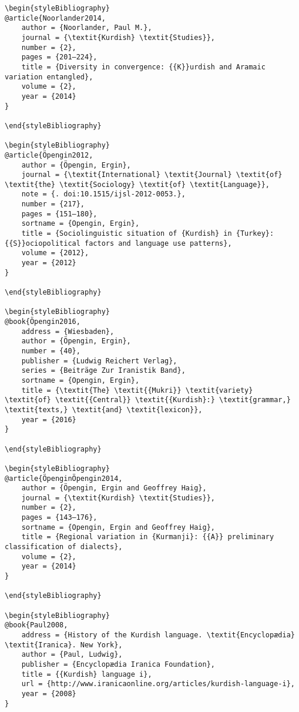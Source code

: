 \documentclass[output=paper]{langsci/langscibook}
\begin{document}
\begin{verbatim}
\begin{styleBibliography}
@article{Noorlander2014,
	author = {Noorlander, Paul M.},
	journal = {\textit{Kurdish} \textit{Studies}},
	number = {2},
	pages = {201–224},
	title = {Diversity in convergence: {{K}}urdish and Aramaic variation entangled},
	volume = {2},
	year = {2014}
}

\end{styleBibliography}

\begin{styleBibliography}
@article{Öpengin2012,
	author = {Öpengin, Ergin},
	journal = {\textit{International} \textit{Journal} \textit{of} \textit{the} \textit{Sociology} \textit{of} \textit{Language}},
	note = {. doi:10.1515/ijsl-2012-0053.},
	number = {217},
	pages = {151–180},
	sortname = {Opengin, Ergin},
	title = {Sociolinguistic situation of {Kurdish} in {Turkey}: {{S}}ociopolitical factors and language use patterns},
	volume = {2012},
	year = {2012}
}

\end{styleBibliography}

\begin{styleBibliography}
@book{Öpengin2016,
	address = {Wiesbaden},
	author = {Öpengin, Ergin},
	number = {40},
	publisher = {Ludwig Reichert Verlag},
	series = {Beiträge Zur Iranistik Band},
	sortname = {Opengin, Ergin},
	title = {\textit{The} \textit{{Mukri}} \textit{variety} \textit{of} \textit{{Central}} \textit{{Kurdish}:} \textit{grammar,} \textit{texts,} \textit{and} \textit{lexicon}},
	year = {2016}
}

\end{styleBibliography}

\begin{styleBibliography}
@article{ÖpenginÖpengin2014,
	author = {Öpengin, Ergin and Geoffrey Haig},
	journal = {\textit{Kurdish} \textit{Studies}},
	number = {2},
	pages = {143–176},
	sortname = {Opengin, Ergin and Geoffrey Haig},
	title = {Regional variation in {Kurmanji}: {{A}} preliminary classification of dialects},
	volume = {2},
	year = {2014}
}

\end{styleBibliography}

\begin{styleBibliography}
@book{Paul2008,
	address = {History of the Kurdish language. \textit{Encyclopædia} \textit{Iranica}. New York},
	author = {Paul, Ludwig},
	publisher = {Encyclopædia Iranica Foundation},
	title = {{Kurdish} language i},
	url = {http://www.iranicaonline.org/articles/kurdish-language-i},
	year = {2008}
}


\end{verbatim}
\end{document}
